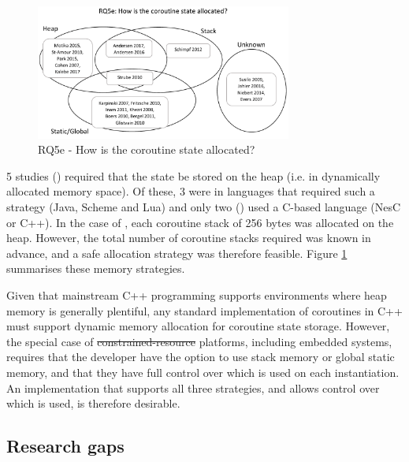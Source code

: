 \documentclass[format=acmsmall, review=false, screen=false]{acmart}
\providecommand{\DIFadd}[1]{{\protect\color{blue}\uwave{#1}}} %
\providecommand{\DIFdel}[1]{{\protect\color{red}\sout{#1}}}                      %
\providecommand{\DIFaddbegin}{} %
\providecommand{\DIFaddend}{} %
\providecommand{\DIFdelbegin}{} %
\providecommand{\DIFdelend}{} %
\newcommand{\DIFscaledelfig}{0.5}
\newlength{\DIFdelgraphicswidth} %
\newlength{\DIFdelgraphicsheight} %
\newcommand{\DIFaddincludegraphics}[2][]{{\color{blue}\fbox{\DIFOincludegraphics[#1]{#2}}}} %
\newcommand{\DIFdelincludegraphics}[2][]{%
\sbox{\DIFdelgraphicsbox}{\DIFOincludegraphics[#1]{#2}}%
\settoboxwidth{\DIFdelgraphicswidth}{\DIFdelgraphicsbox} %
\settoboxtotalheight{\DIFdelgraphicsheight}{\DIFdelgraphicsbox} %
\scalebox{\DIFscaledelfig}{%
\parbox[b]{\DIFdelgraphicswidth}{\usebox{\DIFdelgraphicsbox}\\[-\baselineskip] \rule{\DIFdelgraphicswidth}{0em}}\llap{\resizebox{\DIFdelgraphicswidth}{\DIFdelgraphicsheight}{%
\setlength{\unitlength}{\DIFdelgraphicswidth}%
\begin{picture}(1,1)%
\thicklines\linethickness{2pt} %
{\color[rgb]{1,0,0}\put(0,0){\framebox(1,1){}}}%
{\color[rgb]{1,0,0}\put(0,0){\line( 1,1){1}}}%
{\color[rgb]{1,0,0}\put(0,1){\line(1,-1){1}}}%
\end{picture}%
}\hspace*{3pt}}} %
} %
\DeclareRobustCommand{\DIFaddbegin}{\DIFOaddbegin \let\includegraphics\DIFaddincludegraphics} %
\DeclareRobustCommand{\DIFaddend}{\DIFOaddend \let\includegraphics\DIFOincludegraphics} %
\DeclareRobustCommand{\DIFdelbegin}{\DIFOdelbegin \let\includegraphics\DIFdelincludegraphics} %
\DeclareRobustCommand{\DIFdelend}{\DIFOaddend \let\includegraphics\DIFOincludegraphics} %
\begin{document}
\begin{figure}
	\includegraphics[width=0.75\textwidth]{coroutine-state-venn-diagram}
	\caption{RQ5e - How is the coroutine state allocated?}
	\label{fig:rq5e2}
\end{figure}

5 studies (\cite{Motika2015, St-Amour2010, Park2015, Cohen2007b, Kalebe2017}) required that the state be stored on the heap (i.e. in dynamically allocated memory space).  Of these, 3 were in languages that required such a strategy (Java, Scheme and Lua) and only two (\cite{Cohen2007b, Kalebe2017}) used a C-based language (NesC or C++). In the case of \cite{Cohen2007b}, each coroutine stack of 256 bytes was allocated on the heap. However, the total number of coroutine stacks required was known in advance, and a safe allocation strategy was therefore feasible. Figure \ref{fig:rq5e2} summarises these memory strategies.

Given that mainstream C++ programming supports environments where heap memory is generally plentiful, any standard implementation of coroutines in C++ must support dynamic memory allocation for coroutine state storage. However, the special case of \DIFdelbegin \DIFdel{constrained-resource }\DIFdelend \DIFaddbegin \DIFadd{resource-constrained }\DIFaddend platforms, including embedded systems, requires that the developer have the option to use stack memory or global static memory, and that they have full control over which is used on each instantiation. An implementation that supports all three strategies, and allows control over which is used, is therefore desirable.%

\subsection{Research gaps}

\newenvironment{vheader}
{ \begin{sideways}\centering\begin{tabular}{c} }
{ \end{tabular}\end{sideways} }
\end{document}
